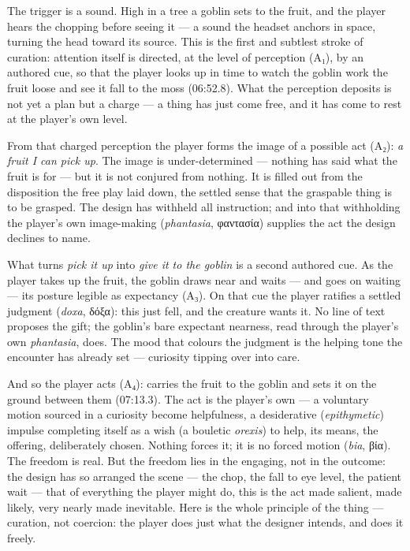 \documentclass{article}
\newcommand{\gk}[1]{{\greekfont #1}}
\begin{document}
The trigger is a sound. High in a tree a goblin sets to the fruit, and the player hears the chopping before seeing it — a sound the headset anchors in space, turning the head toward its source. This is the first and subtlest stroke of curation: attention itself is directed, at the level of perception (A₁), by an authored cue, so that the player looks up in time to watch the goblin work the fruit loose and see it fall to the moss (06:52.8). What the perception deposits is not yet a plan but a charge — a thing has just come free, and it has come to rest at the player's own level.

From that charged perception the player forms the image of a possible act (A₂): \textit{a fruit I can pick up}. The image is under-determined — nothing has said what the fruit is for — but it is not conjured from nothing. It is filled out from the disposition the free play laid down, the settled sense that the graspable thing is to be grasped. The design has withheld all instruction; and into that withholding the player's own image-making (\textit{phantasia}, \gk{φαντασία}) supplies the act the design declines to name.

What turns \textit{pick it up} into \textit{give it to the goblin} is a second authored cue. As the player takes up the fruit, the goblin draws near and waits — and goes on waiting — its posture legible as expectancy (A₃). On that cue the player ratifies a settled judgment (\textit{doxa}, \gk{δόξα}): this just fell, and the creature wants it. No line of text proposes the gift; the goblin's bare expectant nearness, read through the player's own \textit{phantasia}, does. The mood that colours the judgment is the helping tone the encounter has already set — curiosity tipping over into care.

And so the player acts (A₄): carries the fruit to the goblin and sets it on the ground between them (07:13.3). The act is the player's own — a voluntary motion sourced in a curiosity become helpfulness, a desiderative (\textit{epithymetic}) impulse completing itself as a wish (a bouletic \textit{orexis}) to help, its means, the offering, deliberately chosen. Nothing forces it; it is no forced motion (\textit{bia}, \gk{βία}). The freedom is real. But the freedom lies in the engaging, not in the outcome: the design has so arranged the scene — the chop, the fall to eye level, the patient wait — that of everything the player might do, this is the act made salient, made likely, very nearly made inevitable. Here is the whole principle of the thing — curation, not coercion: the player does just what the designer intends, and does it freely.
\end{document}
